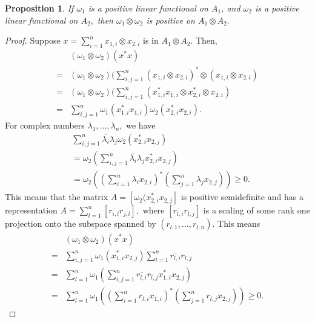 \documentclass{article}
\theoremstyle{plain}
\newtheorem{proposition}[theorem]{Proposition}
\theoremstyle{definition}
\theoremstyle{remark}
\begin{document}
\begin{proposition}
	If $\omega_1$ is a positive linear functional on $A_1$, and 
	$\omega_2$ is a positive linear functional on $A_2,$ then $\omega_1 \otimes
	\omega_2$ is positive on $A_1 \otimes A_2.$
\end{proposition}
\begin{proof}
	Suppose $x = \sum_{i=1}^{n} x_{1,i} \otimes x_{2,i}$ is in $A_1 \otimes
	A_2.$ Then,
\begin{align*}
	{}& (\omega_1 \otimes \omega_2) (x^\ast x) \\
	={}& (\omega_1 \otimes \omega_2) (\sum_{i,j=1}^{n} 
	(x_{1,i} \otimes x_{2,i} )^\ast \otimes (x_{1,i} \otimes x_{2,i} ) \\
	={}& (\omega_1 \otimes \omega_2) (\sum_{i,j=1}^{n} 
	(x_{1,i}^\ast x_{1,i} \otimes x_{2,i}^\ast \otimes x_{2,i} ) \\
	={}& \sum_{i,j=1}^{n} 
	\omega_1 (x_{1,i}^\ast x_{1,i}) \omega_2 (x_{2,i}^\ast x_{2,i}).
\end{align*}
For complex numbers $\lambda_1, \dotsc, \lambda_n,$ we have
\begin{align*}
	{}& \sum_{i,j=1}^{n} \overline{\lambda_i} \lambda_j \omega_2 (x_{2,i}^\ast x_{2,j} )  \\
{}&= \omega_2( \sum_{i,j=1}^{n} \overline{\lambda_i} \lambda_j x_{2,i}^\ast x_{2,j} ) \\
{}&= \omega_2( ( \sum_{i=1}^{n} {\lambda_i}  x_{2,i})^\ast ( \sum_{j=1}^{n} \lambda_j x_{2,j}) )  \geq 0.
\end{align*}
This means that the matrix $A = [\omega_2(x_{2,i} ^\ast x_{2,j} ]$ is positive semidefinite and has a representation $A = \sum_{l=1}^{n} [\overline{r_{i,l}} r_{j,l} ],$
where $[\overline{r_{l,i}} r_{l,j} ]$ is a scaling of some rank one projection 
onto the subspace spanned by $(r_{l,1}, \dotsc, r_{l,n} ).$  
This means
\begin{align*}
	{}& (\omega_1 \otimes \omega_2) (x^\ast x) \\
	={}&  \sum_{i,j=1}^{n} \omega_1(x_{1,i}^\ast x_{2,j}) \sum_{l=1}^{n} \overline{r_{l,i}} r_{l,j} \\
	={}& \sum_{l=1}^{n} \omega_1(\sum_{i,j=1}^{n} \overline{r_{l,i}} r_{l,j} 
	x_{1,i}^\ast x_{2,j} ) \\
	={}& \sum_{l=1}^{n} \omega_1( (\sum_{i=1}^{n} r_{l,i} x_{1,i} )^\ast
	( \sum_{j=1}^{n} r_{l,j} x_{2,j})) \geq 0.
\end{align*}

\end{proof}
\end{document}
